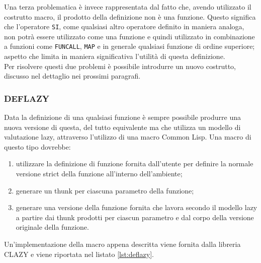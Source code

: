 Una terza problematica è invece rappresentata dal fatto che, avendo utilizzato
il costrutto macro, il prodotto della definizione non è una funzione. Questo
significa che l'operatore \texttt{SI}, come qualsiasi altro operatore definito
in maniera analoga, non potrà essere utilizzato come una funzione e quindi
utilizzato in combinazione a funzioni come \texttt{FUNCALL}, \texttt{MAP} e in
generale qualsiasi funzione di ordine superiore; aspetto che limita in maniera
significativa l'utilità di questa definizione.\\

Per risolvere questi due problemi è possibile introdurre un nuovo costrutto,
discusso nel dettaglio nei prossimi paragrafi.

\subsubsection{DEFLAZY}

Data la definizione di una qualsiasi funzione è sempre possibile produrre una
nuova versione di questa, del tutto equivalente ma che utilizza un modello di
valutazione lazy, attraverso l’utilizzo di una macro Common Lisp. Una macro di
questo tipo dovrebbe:

\begin{enumerate}

\item utilizzare la definizione di funzione fornita dall'utente per definire la
normale versione strict della funzione all'interno dell'ambiente;

\item generare un thunk per ciascuna parametro della funzione;

\item generare una versione della funzione fornita che lavora secondo il modello
lazy a partire dai thunk prodotti per ciascun parametro e dal corpo della
versione originale della funzione.

\end{enumerate}

Un'implementazione della macro appena descritta viene fornita dalla libreria
CLAZY \cite{DBLP:journals/corr/Antoniotti14} e viene riportata nel listato
\ref{lst:deflazy}.


